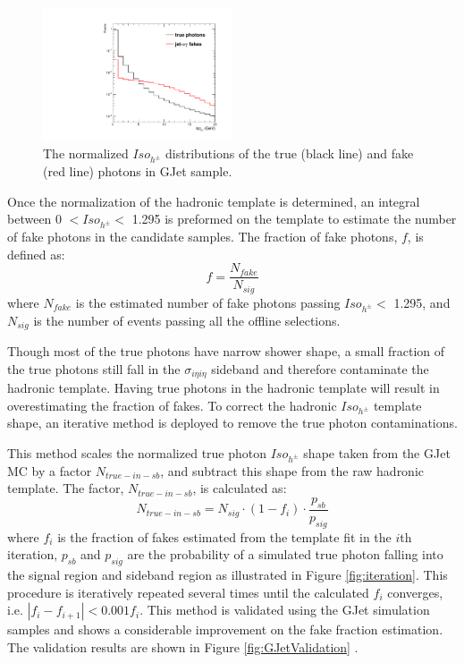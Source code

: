 \documentclass[thesis.tex]{subfiles}
\renewcommand\_{\textunderscore\allowbreak}
\begin{document}
\begin{figure}[hbtp]
  \centering
    \includegraphics[width=0.5\textwidth]{Figures/PLOT_JetPhoTemplate.pdf}
  \caption{The normalized $Iso_{h^\pm}$ distributions of the true (black line) and fake (red line) photons in GJet sample.}
    \label{fig:fakeinGJet}
\end{figure}

Once the normalization of the hadronic template is determined, an integral between 0 $< Iso_{h^\pm} <$ 1.295 is preformed on the template to estimate the number of fake photons in the candidate samples. The fraction of fake photons, $f$, is defined as: 
\begin{equation}
		f = \frac{N_{fake}}{N_{sig}}
\end{equation}
where $N_{fake}$ is the estimated number of fake photons passing $Iso_{h^\pm} < $ 1.295, and $N_{sig}$ is the number of events passing all the offline selections. 

Though most of the true photons have narrow shower shape, a small fraction of the true photons still fall in the $\sigma_{i\eta i\eta}$ sideband and therefore contaminate the hadronic template. Having true photons in the hadronic template will result in overestimating the fraction of fakes. To correct the hadronic $Iso_{h^\pm}$ template shape, an iterative method is deployed to remove the true photon contaminations.

This method scales the normalized true photon $Iso_{h^\pm}$ shape taken from the GJet MC by a factor $N_{true-in-sb}$, and subtract this shape from the raw hadronic template. The factor, $N_{true-in-sb}$,  is calculated as:
\begin{equation}
		N_{true-in-sb} = N_{sig} \cdot (1-f_i) \cdot \frac{p_{sb}}{p_{sig}}
\end{equation}
where $f_i$ is the fraction of fakes estimated from the template fit in the $i$th iteration, $p_{sb}$ and $p_{sig}$ are the probability of a simulated true photon falling into the signal region and sideband region as illustrated in Figure \ref{fig:iteration}. This procedure is iteratively repeated several times until the calculated $f_i$ converges, i.e. $|f_i - f_{i+1}| < 0.001f_i$. This method is validated using the GJet simulation samples and shows a considerable improvement on the fake fraction estimation. The validation results are shown in Figure \ref{fig:GJetValidation} .
\end{document}
